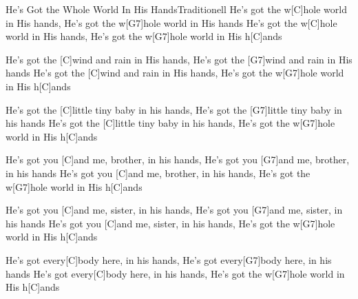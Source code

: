 \documentclass[../main.tex]{subfiles}
\begin{document}
\begin{songwithoutpagebreak}{He's Got the Whole World In His Hands}{Traditionell}{}
He's got the w[C]hole world in His hands, He's got the w[G7]hole world in His hands
He's got the w[C]hole world in His hands, He's got the w[G7]hole world in His h[C]ands

He's got the [C]wind and rain in His hands, He's got the [G7]wind and rain in His hands
He's got the [C]wind and rain in His hands, He's got the w[G7]hole world in His h[C]ands

He's got the [C]little tiny baby in his hands, He's got the [G7]little tiny baby in his hands
He's got the [C]little tiny baby in his hands, He's got the w[G7]hole world in His h[C]ands

He's got you [C]and me, brother, in his hands, He's got you [G7]and me, brother, in his hands
He's got you [C]and me, brother, in his hands, He's got the w[G7]hole world in His h[C]ands

He's got you [C]and me, sister, in his hands, He's got you [G7]and me, sister, in his hands
He's got you [C]and me, sister, in his hands, He's got the w[G7]hole world in His h[C]ands

He's got every[C]body here, in his hands, He's got every[G7]body here, in his hands
He's got every[C]body here, in his hands, He's got the w[G7]hole world in His h[C]ands
\end{songwithoutpagebreak}
\end{document}
